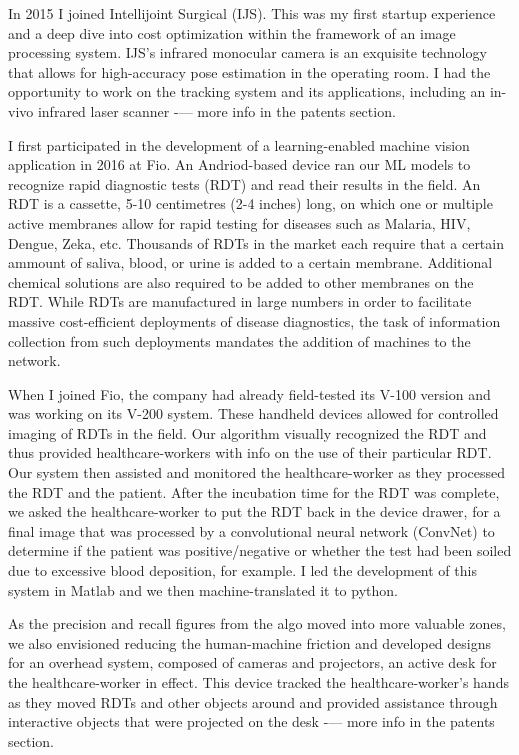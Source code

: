 \osspacing
In 2015 I joined Intellijoint Surgical (IJS). This was my first startup experience and a deep dive into cost optimization within the framework of an image processing system. IJS's infrared monocular camera is an exquisite technology that allows for high-accuracy pose estimation in the operating room. I had the opportunity to work on the tracking system and its applications, including an in-vivo infrared laser scanner -— more info in the patents section.

\osspacing
I first participated in the development of a learning-enabled machine vision application in 2016 at Fio. An Andriod-based device ran our ML models to recognize rapid diagnostic tests (RDT) and read their results in the field. An RDT is a cassette, 5-10 centimetres (2-4 inches) long, on which one or multiple active membranes allow for rapid testing for diseases such as Malaria, HIV, Dengue, Zeka, etc. Thousands of RDTs in the market each require that a certain ammount of saliva, blood, or urine is added to a certain membrane. Additional chemical solutions are also required to be added to other membranes on the RDT. While RDTs are manufactured in large numbers in order to facilitate massive cost-efficient deployments of disease diagnostics, the task of information collection from such deployments mandates the addition of machines to the network. 

\osspacing
When I joined Fio, the company had already field-tested its V-100 version and was working on its V-200 system. These handheld devices allowed for controlled imaging of RDTs in the field. Our algorithm visually recognized the RDT and thus provided healthcare-workers with info on the use of their particular RDT. Our system then assisted and monitored the healthcare-worker as they processed the RDT and the patient. After the incubation time for the RDT was complete, we asked the healthcare-worker to put the RDT back in the device drawer, for a final image that was processed by a convolutional neural network (ConvNet) to determine if the patient was positive/negative or whether the test had been soiled due to excessive blood deposition, for example. I led the development of this system in Matlab and we then machine-translated it to python. 
 
\osspacing
As the precision and recall figures from the algo moved into more valuable zones, we also envisioned reducing the human-machine friction and developed designs for an overhead system, composed of cameras and projectors, an active desk for the healthcare-worker in effect. This device tracked the healthcare-worker's hands as they moved RDTs and other objects around and provided assistance through interactive objects that were projected on the desk -— more info in the patents section.

